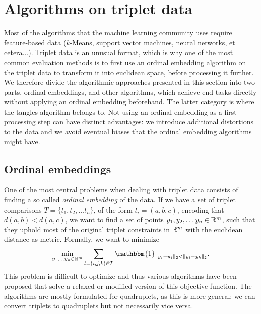 \section{Algorithms on triplet data}
Most of the algorithms that the machine learning community uses require feature-based data 
($k$-Means, support vector machines, neural networks, et cetera...).
Triplet data is an unusual format, which is why one of the most common evaluation
methods is to first use an ordinal embedding algorithm on the triplet data to transform
it into euclidean space, before processing it further.  
We therefore divide the algorithmic approaches presented in this section into two parts, 
ordinal embeddings, and other algorithms, which achieve
end tasks directly without applying an ordinal embedding beforehand. 
The latter category is where the tangles algorithm belongs to. Not using an ordinal embedding
as a first processing step can have distinct advantages: 
we introduce additional distortions to the data and we avoid eventual biases that the ordinal embedding algorithms might have.

\subsection{Ordinal embeddings}
One of the most central problems when dealing with triplet data consists of finding a so called \textit{ordinal embedding} of the data. If we have a set of triplet comparisons $T = \{t_1, t_2, \ldots t_n\}$, 
of the form $t_i = \left( a,b,c \right)$, encoding that $d(a,b) < d(a,c)$, 
we want to find a set of points $y_1, y_2, \ldots y_n \in \mathbb{R}^{m}$, such that they uphold most of the original triplet constraints in $\mathbb{R}^{m}$ with the euclidean distance
as metric. Formally, we want to minimize \citep{vankadaraInsightsOrdinalEmbedding2021}
\begin{align*}
    \min_{y_1, \ldots y_n \in \R^{m}} \sum_{t=\left( i,j,k \right)  \in T} \mathbbm{1}_{ \|y_i - y_j\|_2 < \|y_i - y_k\|_2 }
.\end{align*}
This problem is difficult to optimize and thus various algorithms have been proposed that solve a relaxed or modified version of this objective function. The algorithms are mostly formulated
for quadruplets, as this is more general: we can convert triplets to quadruplets but not 
necessarily vice versa.

